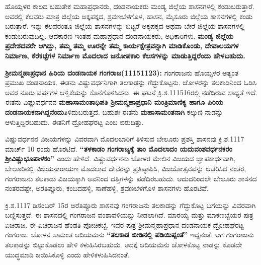 ಹೊಯ್ಸಳರ ಕಾಲದ ಬಹುತೇಕ ಮಹಾಪ್ರಧಾನರು, ದಂಡನಾಯಕರು ಮಂಡ್ಯ ಜಿಲ್ಲೆಯ ಶಾಸನಗಳಲ್ಲಿ ಕಂಡು\-ಬರುತ್ತಾರೆ. ಅವರಲ್ಲಿ ಕೆಲವರು ಮಾತ್ರ ಜಿಲ್ಲೆಯ ಅಕ್ಕಪಕ್ಕದ, ಶ್ರವಣಬೆಳಗೊಳ, ಹಾಸನ, ಮೈಸೂರು ಜಿಲ್ಲೆಯ ಶಾಸನಗಳಲ್ಲಿ ಕಂಡು ಬರುತ್ತಾರೆ. ಇನ್ನು ಕೆಲವರಂತೂ ಜಿಲ್ಲೆಯ ಶಾಸನಗಳನ್ನು ಬಿಟ್ಟರೆ ಅಕ್ಕಪಕ್ಕದ ಅಥವಾ ಬೇರೆ ಜಿಲ್ಲೆಯ ಶಾಸನಗಳಲ್ಲಿ ಕಂಡುಬರುವುದಿಲ್ಲ. ಆದಕಾರಣ ಇಂತಹ ಮಹಾಪ್ರಧಾನ ದಂಡನಾಯಕರು, ಅಧಿಕಾರಿಗಳು, \textbf{ಮಂಡ್ಯ ಜಿಲ್ಲೆಯ ಪ್ರದೇಶದವರೇ ಆಗಿದ್ದು, ತಮ್ಮ ತಮ್ಮ ಊರನ್ನೇ ತಮ್ಮ ಕಾರ್ಯಕ್ಷೇತ್ರವನ್ನಾಗಿ ಮಾಡಿಕೊಂಡು, ದೇವಾಲಯಗಳ ನಿರ್ಮಾಣ, ಕೆರೆಕಟ್ಟೆಗಳ ನಿರ್ಮಾಣ ಮೊದಲಾದ ಜನೋಪಕಾರಿ ಕೆಲಸಗಳನ್ನು ಮಾಡುತ್ತಿದ್ದರೆಂದು ಹೇಳಬಹುದು.}

\textbf{ಶ‍್ರೀಮನ್ಮಹಾಪ್ರಧಾನ ಹಿರಿಯ ದಂಡನಾಯಕ ಗಂಗರಾಜ(1115\general{\enginline{-}}1123):} ಗಂಗರಾಜನು ಹೊಯ್ಸಳರ ಅತ್ಯಂತ ಪ್ರಮುಖ ದಂಡನಾಯಕ. ಈತನು ವಿಷ್ಣುವರ್ಧನಿಗಾಗಿ ತಲಕಾಡನ್ನು ಗೆದ್ದುಕೊಟ್ಟನು. ಚೋಳರನ್ನು ತಲಕಾಡಿನಿಂದ ಓಡಿಸಿ ಅವರ ನೂರು ವರ್ಷಗಳ ಆಳ್ವಿಕೆಯನ್ನು ಕೊನೆಗೊಳಿಸಿದನು. ಈ ಘಟನೆ ಕ್ರಿ.ಶ.1115\enginline{-}16ರಲ್ಲಿ ನಡೆದಿರುವ ಸಾಧ್ಯತೆ ಇದೆ. ಈತನು ವಿಷ್ಣುವರ್ಧನನ \textbf{ಮಹಾಸಾಮಂತಾಧಿಪತಿ ಶ‍್ರೀಮನ್ಮಹಾಪ್ರಧಾನಿ ಮಂತ್ರಿಮಾಣಿಕ್ಯ ಹಾಗೂ ಪಿರಿಯ ದಂಡನಾಯಕನಾಗಿದ್ದನೆಂದು}ತಿಳಿದುಬರುತ್ತದೆ. ಬಹುಶಃ ಈತನು \textbf{ಮಹಾಸಾಮಂತನಾಗಿ} ಕಲ್ಕುಣಿ ನಾಡನ್ನು ಆಳುತ್ತಿದ್ದಿರ\-ಬಹುದು. ಈತನಿಗೆ ದ್ರೋಹಘರಟ್ಟ ಎಂಬ ಬಿರುದಿತ್ತು.

ವಿಷ್ಣುವರ್ಧನನ ವಿಜಯಗಳನ್ನು ವಿವರವಾಗಿ ಮೊದಲಬಾರಿಗೆ ತಿಳಿಸುವ ಬೇಲೂರು ಪ್ರಶಸ್ತಿ ಶಾಸನವು ಕ್ರಿ.ಶ.1117 ಮಾರ್ಚ್ 10 ರಂದು ಹೊರಟಿದೆ. \textbf{“ತಳಕಾಡಂ ಗಂಗರಾಜ್ಯಕ್ಕೆ ತಾಂ ಮೊದಲಾದಂ ಯದುವಂಶವರ್ಧನಕರಂ ಶ‍್ರೀವಿಷ್ಣು\-ಭೂಪಾಳಕಂ” }ಎಂದು ಹೇಳಿದೆ. ವಿಷ್ಣುವರ್ಧನನು ಚೋಳರ ಮೇಲಿನ ವಿಜಯದ ಜ್ಞಾಪಕಾರ್ಥವಾಗಿ, ಬೇಲೂರಿನಲ್ಲಿ ವಿಜಯನಾರಾಯಣ ಮೊದಲಾದ ದೇವರನ್ನು ಪ್ರತಿಷ್ಠಾಪಿಸಿ, ವಿಜಯೋತ್ಸವವನ್ನು ಆಚರಿಸಿದ ನಂತರ, ಗಂಗರಾಜನು ತಲಕಾಡು ವಿಜಯಕ್ಕಾಗಿ ಅವನಿಂದ ದತ್ತಿಗಳನ್ನು ಪಡೆದಿರಬಹುದು. ಆದುದರಿಂದಲೇ ಬೇಲೂರು ಶಾಸನದ ನಂತರವಷ್ಟೇ, ಅರೆತಿಪ್ಪೂರು, ಕಂಬದಹಳ್ಳಿ, ಸಾಣೆಹಳ್ಳಿ, ಶ್ರವಣಬೆಳಗೊಳ ಶಾಸನಗಳು ಹೊರಟಿವೆ.

ಕ್ರಿ.ಶ.1117 ಡಿಸೆಂಬರ್​ 15ರ ಅರೆತಿಪ್ಪೂರು ಶಾಸನವು ಗಂಗರಾಜನು ತಲಕಾಡನ್ನು ಗೆದ್ದುಕೊಟ್ಟ ಬಗೆಯನ್ನು ವಿವರವಾಗಿ ಬಣ್ಣಿಸುತ್ತದೆ. ಈ ಶಾಸನದಲ್ಲಿ ಗಂಗರಾಜನ ವಂಶಾವಳಿಯನ್ನು ನೀಡಲಾಗಿದೆ. ಮಾರಯ್ಯ ಮತ್ತು ಮಾಕಣಬ್ಬೆಯರ ಪುತ್ರ ಏಚಿರಾಜ. ಈ ಏಚಿರಾಜನ ಹೆಂಡತಿ ಪೋಚಿಕಬ್ಬೆ. ಇವರ ಪುತ್ರ ಶ‍್ರೀಮನ್ಮಹಾಪ್ರಧಾನ ದಂಡನಾಯಕ ದ್ರೋಹಘರಟ್ಟ ಗಂಗರಾಜ. ಚೋಳನ ಸಾಮಂತ ಆದಿಯಮನು \textbf{“ತಲಕಾಡ ಬೀಡಿನಲ್ಲಿ ಪಡಿಯಿಪ್ಪಂತೆ”} ಇದ್ದನಂತೆ. ಆಗ ಗಂಗರಾಜನು ತಲಕಾಡನ್ನು ಬಿಟ್ಟುಕೊಡಲು ಹೇಳಿ ಕಳುಹಿಸಿರಬಹುದು. ಅದಕ್ಕೆ ಆದಿಯಮನು ಚೋಳಕೊಟ್ಟ ನಾಡನ್ನು ಕೊಡದೇ ಯುದ್ಧಮಾಡಿ ಜಯಿಸಿಕೊಳ್ಳಿ ಎಂದು ಹೇಳಿಕಳುಹಿಸಿದನಂತೆ.

